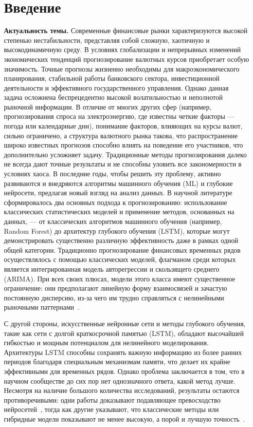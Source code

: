 \chapter*{Введение}

\textbf{Актуальность темы.}
Современные финансовые рынки характеризуются высокой степенью нестабильности, представляя собой сложную, хаотичную и высокодинамичную среду. В условиях глобализации и непрерывных изменений экономических тенденций прогнозирование валютных курсов приобретает особую значимость. Точные прогнозы жизненно необходимы для макроэкономического планирования, стабильной работы банковского сектора, инвестиционной деятельности и эффективного государственного управления.
Однако данная задача осложнена беспрецедентно высокой волатильностью и неполнотой рыночной информации. В отличие от многих других сфер (например, прогнозирования спроса на электроэнергию, где известны четкие факторы — погода или календарные дни), понимание факторов, влияющих на курсы валют, сильно ограничено, а структура валютного рынка такова, что распространение широко известных прогнозов 
способно влиять на поведение его участников, что дополнительно усложняет задачу. Традиционные методы прогнозирования далеко не всегда дают точные результаты и не способны уловить все закономерности в условиях хаоса. В последние годы, чтобы решить эту проблему, активно развиваются и внедряются алгоритмы машинного обучения (ML) и глубокие нейросети, предлагая новый взгляд на анализ данных.
В научной литературе сформировалось два основных подхода к прогнозированию: использование 
классических статистических моделей и применение методов, основанных на данных, — от 
классических алгоритмов машинного обучения (например, Random Forest) до архитектур 
глубокого обучения (LSTM), которые могут демонстрировать существенно различную эффективность 
даже в рамках одной общей категории. Традиционно прогнозирование финансовых временных рядов осуществлялось с помощью классических моделей, флагманом среди которых является интегрированная модель авторегрессии и скользящего среднего (ARIMA). При всех своих плюсах, модели этого класса имеют существенное ограничение: они предполагают линейную форму взаимосвязей и зачастую постоянную дисперсию, из-за чего им трудно справляться с нелинейными рыночными паттернами~\cite{zhang2003, enders2015}.

С другой стороны, искусственные нейронные сети и методы глубокого обучения, такие как сети с долгой краткосрочной памятью (LSTM), обладают высочайшей гибкостью и мощным потенциалом для нелинейного моделирования. Архитектуры LSTM способны сохранять важную информацию из более ранних периодов благодаря специальным механизмам памяти, что делает их крайне эффективными для временных рядов. Однако проблема заключается в том, что в научном сообществе до сих пор нет однозначного ответа, какой метод лучше. Несмотря на наличие большого количества исследований, результаты остаются противоречивыми: одни работы доказывают подавляющее превосходство нейросетей~\cite{siami2018, nelson2017lstm}, тогда как другие указывают, что классические методы или гибридные модели показывают 
не менее высокую, а порой и лучшую точность~\cite{makridakis2018}.

